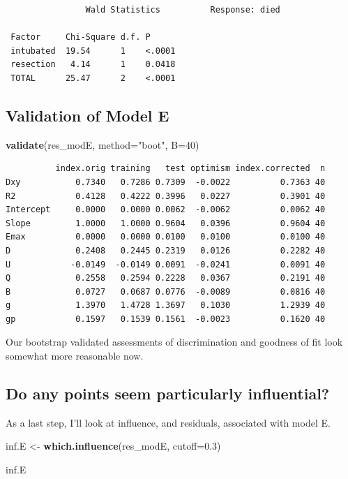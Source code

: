 \documentclass[]{book}
\newenvironment{Shaded}{\begin{snugshade}}{\end{snugshade}}
\newcommand{\KeywordTok}[1]{\textcolor[rgb]{0.13,0.29,0.53}{\textbf{#1}}}
\newcommand{\DataTypeTok}[1]{\textcolor[rgb]{0.13,0.29,0.53}{#1}}
\newcommand{\DecValTok}[1]{\textcolor[rgb]{0.00,0.00,0.81}{#1}}
\newcommand{\FloatTok}[1]{\textcolor[rgb]{0.00,0.00,0.81}{#1}}
\newcommand{\StringTok}[1]{\textcolor[rgb]{0.31,0.60,0.02}{#1}}
\newcommand{\NormalTok}[1]{#1}
\theoremstyle{definition}
\theoremstyle{definition}
\theoremstyle{definition}
\theoremstyle{remark}
\begin{document}
\begin{verbatim}
                Wald Statistics          Response: died 

 Factor     Chi-Square d.f. P     
 intubated  19.54      1    <.0001
 resection   4.14      1    0.0418
 TOTAL      25.47      2    <.0001
\end{verbatim}

\subsection{Validation of Model E}\label{validation-of-model-e}

\begin{Shaded}
\begin{Highlighting}[]
\KeywordTok{validate}\NormalTok{(res_modE, }\DataTypeTok{method=}\StringTok{"boot"}\NormalTok{, }\DataTypeTok{B=}\DecValTok{40}\NormalTok{)}
\end{Highlighting}
\end{Shaded}

\begin{verbatim}
          index.orig training   test optimism index.corrected  n
Dxy           0.7340   0.7286 0.7309  -0.0022          0.7363 40
R2            0.4128   0.4222 0.3996   0.0227          0.3901 40
Intercept     0.0000   0.0000 0.0062  -0.0062          0.0062 40
Slope         1.0000   1.0000 0.9604   0.0396          0.9604 40
Emax          0.0000   0.0000 0.0100   0.0100          0.0100 40
D             0.2408   0.2445 0.2319   0.0126          0.2282 40
U            -0.0149  -0.0149 0.0091  -0.0241          0.0091 40
Q             0.2558   0.2594 0.2228   0.0367          0.2191 40
B             0.0727   0.0687 0.0776  -0.0089          0.0816 40
g             1.3970   1.4728 1.3697   0.1030          1.2939 40
gp            0.1597   0.1539 0.1561  -0.0023          0.1620 40
\end{verbatim}

Our bootstrap validated assessments of discrimination and goodness of
fit look somewhat more reasonable now.

\subsection{Do any points seem particularly
influential?}\label{do-any-points-seem-particularly-influential}

As a last step, I'll look at influence, and residuals, associated with
model E.

\begin{Shaded}
\begin{Highlighting}[]
\NormalTok{inf.E <-}\StringTok{ }\KeywordTok{which.influence}\NormalTok{(res_modE, }\DataTypeTok{cutoff=}\FloatTok{0.3}\NormalTok{)}

\NormalTok{inf.E}
\end{Highlighting}
\end{Shaded}
\end{document}
